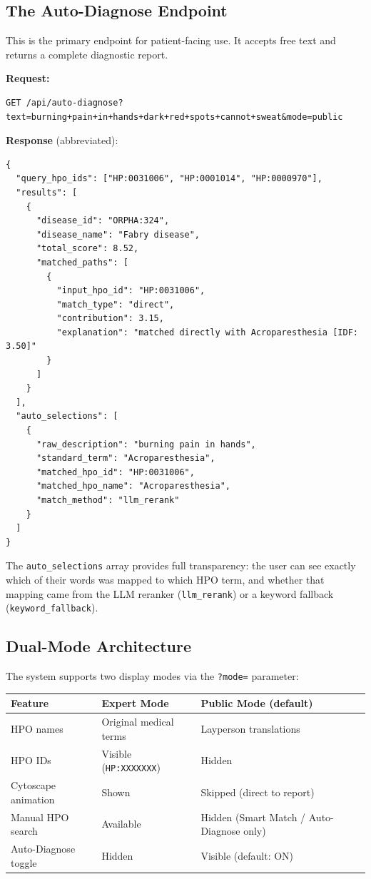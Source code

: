 \documentclass[11pt,a4paper]{article}
\begin{document}
\subsection{The Auto-Diagnose Endpoint}

This is the primary endpoint for patient-facing use. It accepts free text and returns a complete diagnostic report.

\textbf{Request:}
\begin{lstlisting}
GET /api/auto-diagnose?text=burning+pain+in+hands+dark+red+spots+cannot+sweat&mode=public
\end{lstlisting}

\textbf{Response} (abbreviated):
\begin{lstlisting}
{
  "query_hpo_ids": ["HP:0031006", "HP:0001014", "HP:0000970"],
  "results": [
    {
      "disease_id": "ORPHA:324",
      "disease_name": "Fabry disease",
      "total_score": 8.52,
      "matched_paths": [
        {
          "input_hpo_id": "HP:0031006",
          "match_type": "direct",
          "contribution": 3.15,
          "explanation": "matched directly with Acroparesthesia [IDF: 3.50]"
        }
      ]
    }
  ],
  "auto_selections": [
    {
      "raw_description": "burning pain in hands",
      "standard_term": "Acroparesthesia",
      "matched_hpo_id": "HP:0031006",
      "matched_hpo_name": "Acroparesthesia",
      "match_method": "llm_rerank"
    }
  ]
}
\end{lstlisting}

The \texttt{auto\_selections} array provides full transparency: the user can see exactly which of their words was mapped to which HPO term, and whether that mapping came from the LLM reranker (\texttt{llm\_rerank}) or a keyword fallback (\texttt{keyword\_fallback}).

\subsection{Dual-Mode Architecture}

The system supports two display modes via the \texttt{?mode=} parameter:

\begin{table}[H]
\centering
\begin{tabular}{@{}lll@{}}
\toprule
\textbf{Feature} & \textbf{Expert Mode} & \textbf{Public Mode (default)} \\
\midrule
HPO names & Original medical terms & Layperson translations \\
HPO IDs & Visible (\texttt{HP:XXXXXXX}) & Hidden \\
Cytoscape animation & Shown & Skipped (direct to report) \\
Manual HPO search & Available & Hidden (Smart Match / Auto-Diagnose only) \\
Auto-Diagnose toggle & Hidden & Visible (default: ON) \\
\bottomrule
\end{tabular}
\end{table}
\end{document}
